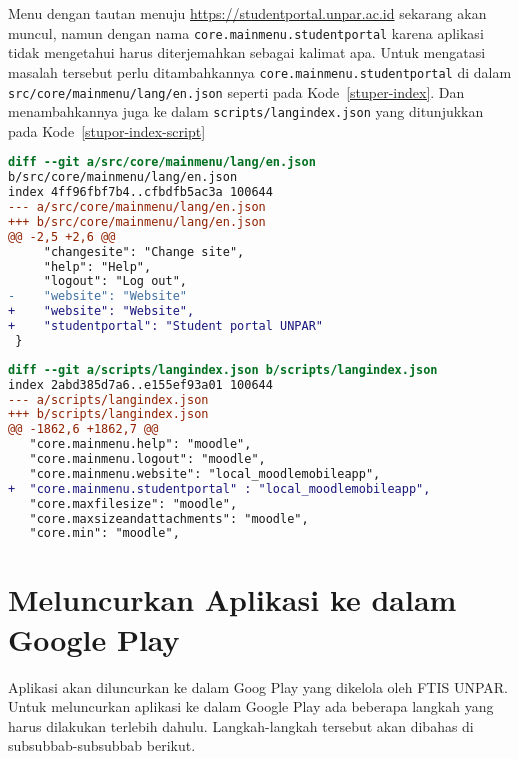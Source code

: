 Menu dengan tautan menuju \url{https://studentportal.unpar.ac.id} sekarang akan muncul, namun dengan nama \texttt{core.mainmenu.studentportal} karena aplikasi tidak mengetahui harus diterjemahkan sebagai kalimat apa. Untuk mengatasi masalah tersebut perlu ditambahkannya \texttt{core.mainmenu.studentportal} di dalam \texttt{src/core/mainmenu/lang/en.json} seperti pada \mbox{Kode \ref{stuper-index}}. Dan menambahkannya juga ke dalam \texttt{scripts/langindex.json} yang ditunjukkan pada  \mbox{Kode \ref{stupor-index-script}}

\begin{lstlisting}[language=diff, frame=single, label ={stupor-index}, caption = Menambahkan \texttt{core.mainmenu.studentportal} pada file  \texttt{src/core/mainmenu/lang/en.json} ]
diff --git a/src/core/mainmenu/lang/en.json 
b/src/core/mainmenu/lang/en.json
index 4ff96fbf7b4..cfbdfb5ac3a 100644
--- a/src/core/mainmenu/lang/en.json
+++ b/src/core/mainmenu/lang/en.json
@@ -2,5 +2,6 @@
     "changesite": "Change site",
     "help": "Help",
     "logout": "Log out",
-    "website": "Website"
+    "website": "Website", 
+    "studentportal": "Student portal UNPAR"
 }
\end{lstlisting} 

\begin{lstlisting}[language=diff, frame=single, label ={stupor-index-script}, caption = Menambahkan \texttt{core.mainmenu.studentportal} pada file  \texttt{scripts/langindex.json} ]
diff --git a/scripts/langindex.json b/scripts/langindex.json
index 2abd385d7a6..e155ef93a01 100644
--- a/scripts/langindex.json
+++ b/scripts/langindex.json
@@ -1862,6 +1862,7 @@
   "core.mainmenu.help": "moodle",
   "core.mainmenu.logout": "moodle",
   "core.mainmenu.website": "local_moodlemobileapp",
+  "core.mainmenu.studentportal" : "local_moodlemobileapp",
   "core.maxfilesize": "moodle",
   "core.maxsizeandattachments": "moodle",
   "core.min": "moodle",
\end{lstlisting} 

\section{Meluncurkan Aplikasi ke dalam Google Play}

Aplikasi akan diluncurkan ke dalam Goog Play yang dikelola oleh FTIS UNPAR. Untuk meluncurkan aplikasi ke dalam Google Play ada beberapa langkah yang harus dilakukan terlebih dahulu. Langkah-langkah tersebut akan dibahas di subsubbab-subsubbab berikut.

